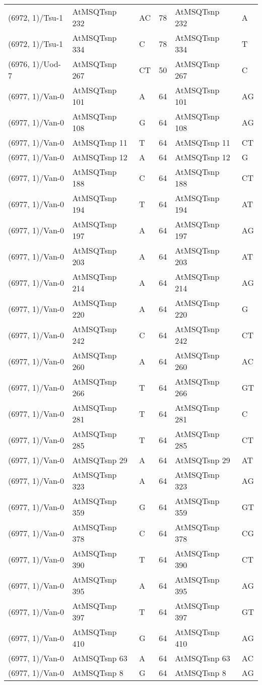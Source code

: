 \begin{center}
\begin{longtable}{|l|l|l|l|l|l|}
(6972, 1)/Tsu-1&AtMSQTsnp 232&AC&78&AtMSQTsnp 232&A\\
(6972, 1)/Tsu-1&AtMSQTsnp 334&C&78&AtMSQTsnp 334&T\\
(6976, 1)/Uod-7&AtMSQTsnp 267&CT&50&AtMSQTsnp 267&C\\
(6977, 1)/Van-0&AtMSQTsnp 101&A&64&AtMSQTsnp 101&AG\\
(6977, 1)/Van-0&AtMSQTsnp 108&G&64&AtMSQTsnp 108&AG\\
(6977, 1)/Van-0&AtMSQTsnp 11&T&64&AtMSQTsnp 11&CT\\
(6977, 1)/Van-0&AtMSQTsnp 12&A&64&AtMSQTsnp 12&G\\
(6977, 1)/Van-0&AtMSQTsnp 188&C&64&AtMSQTsnp 188&CT\\
(6977, 1)/Van-0&AtMSQTsnp 194&T&64&AtMSQTsnp 194&AT\\
(6977, 1)/Van-0&AtMSQTsnp 197&A&64&AtMSQTsnp 197&AG\\
(6977, 1)/Van-0&AtMSQTsnp 203&A&64&AtMSQTsnp 203&AT\\
(6977, 1)/Van-0&AtMSQTsnp 214&A&64&AtMSQTsnp 214&AG\\
(6977, 1)/Van-0&AtMSQTsnp 220&A&64&AtMSQTsnp 220&G\\
(6977, 1)/Van-0&AtMSQTsnp 242&C&64&AtMSQTsnp 242&CT\\
(6977, 1)/Van-0&AtMSQTsnp 260&A&64&AtMSQTsnp 260&AC\\
(6977, 1)/Van-0&AtMSQTsnp 266&T&64&AtMSQTsnp 266&GT\\
(6977, 1)/Van-0&AtMSQTsnp 281&T&64&AtMSQTsnp 281&C\\
(6977, 1)/Van-0&AtMSQTsnp 285&T&64&AtMSQTsnp 285&CT\\
(6977, 1)/Van-0&AtMSQTsnp 29&A&64&AtMSQTsnp 29&AT\\
(6977, 1)/Van-0&AtMSQTsnp 323&A&64&AtMSQTsnp 323&AG\\
(6977, 1)/Van-0&AtMSQTsnp 359&G&64&AtMSQTsnp 359&GT\\
(6977, 1)/Van-0&AtMSQTsnp 378&C&64&AtMSQTsnp 378&CG\\
(6977, 1)/Van-0&AtMSQTsnp 390&T&64&AtMSQTsnp 390&CT\\
(6977, 1)/Van-0&AtMSQTsnp 395&A&64&AtMSQTsnp 395&AG\\
(6977, 1)/Van-0&AtMSQTsnp 397&T&64&AtMSQTsnp 397&GT\\
(6977, 1)/Van-0&AtMSQTsnp 410&G&64&AtMSQTsnp 410&AG\\
(6977, 1)/Van-0&AtMSQTsnp 63&A&64&AtMSQTsnp 63&AC\\
(6977, 1)/Van-0&AtMSQTsnp 8&G&64&AtMSQTsnp 8&AG\\

\end{longtable}
\end{center}

